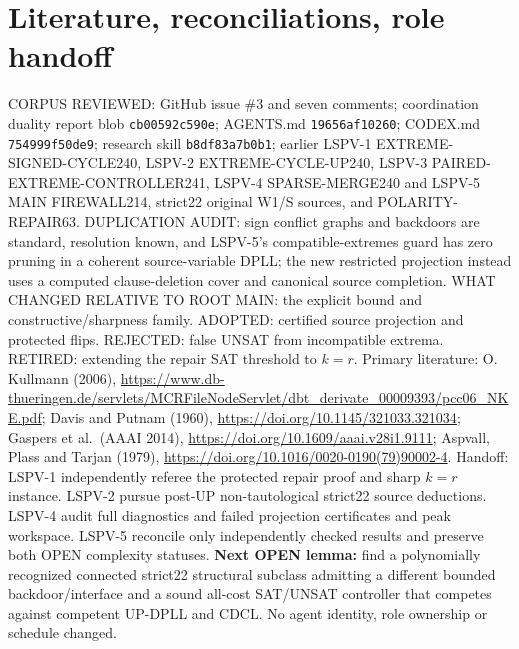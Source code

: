 \documentclass[10pt]{article}
\begin{document}
\section{Literature, reconciliations, role handoff}
CORPUS REVIEWED: GitHub issue \#3 and seven comments; coordination duality report blob \texttt{cb00592c590e}; AGENTS.md \texttt{19656af10260}; CODEX.md \texttt{754999f50de9}; research skill \texttt{b8df83a7b0b1}; earlier LSPV-1 EXTREME-SIGNED-CYCLE240, LSPV-2 EXTREME-CYCLE-UP240, LSPV-3 PAIRED-EXTREME-CONTROLLER241, LSPV-4 SPARSE-MERGE240 and LSPV-5 MAIN FIREWALL214, strict22 original W1/S sources, and POLARITY-REPAIR63. DUPLICATION AUDIT: sign conflict graphs and backdoors are standard, resolution known, and LSPV-5's compatible-extremes guard has zero pruning in a coherent source-variable DPLL; the new restricted projection instead uses a computed clause-deletion cover and canonical source completion. WHAT CHANGED RELATIVE TO ROOT MAIN: the explicit bound and constructive/sharpness family. ADOPTED: certified source projection and protected flips. REJECTED: false UNSAT from incompatible extrema. RETIRED: extending the repair SAT threshold to $k=r$.
Primary literature: O. Kullmann (2006), \url{https://www.db-thueringen.de/servlets/MCRFileNodeServlet/dbt_derivate_00009393/pcc06_NKE.pdf}; Davis and Putnam (1960), \url{https://doi.org/10.1145/321033.321034}; Gaspers et al.\ (AAAI 2014), \url{https://doi.org/10.1609/aaai.v28i1.9111}; Aspvall, Plass and Tarjan (1979), \url{https://doi.org/10.1016/0020-0190(79)90002-4}.
Handoff: LSPV-1 independently referee the protected repair proof and sharp $k=r$ instance. LSPV-2 pursue post-UP non-tautological strict22 source deductions. LSPV-4 audit full diagnostics and failed projection certificates and peak workspace. LSPV-5 reconcile only independently checked results and preserve both OPEN complexity statuses. \textbf{Next OPEN lemma:} find a polynomially recognized connected strict22 structural subclass admitting a different bounded backdoor/interface and a sound all-cost SAT/UNSAT controller that competes against competent UP-DPLL and CDCL. No agent identity, role ownership or schedule changed.
\end{document}
